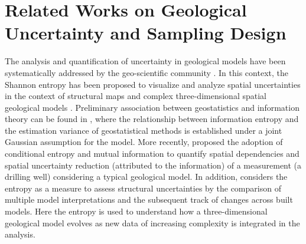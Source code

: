 \section{Related Works on Geological Uncertainty and Sampling Design} %
\label{sec_literature_context_PI}
{The analysis and quantification of uncertainty in geological models have been systematically addressed by the geo-scientific community} \citep{gutjahr1991,goovaerts2001,Scheidt2009_a,wellman_2012a}. { In this context, the Shannon entropy has been proposed to visualize and analyze spatial uncertainties in the context of structural maps and complex three-dimensional spatial geological models \citep{goodchild_1994,wellman_2012a,wellman_2010a}. Preliminary association between geostatistics and information theory can be found in \citep{peschel_1991a}, where the relationship between information entropy and the estimation variance of geostatistical methods is established under a joint Gaussian assumption for the model.
More recently, \citep{wellman_2013} proposed the adoption of conditional entropy and mutual information to quantify spatial dependencies and spatial uncertainty reduction (attributed to the information) of a measurement (a drilling well) considering  a typical geological model.
In addition, \citep{schweizer_2017a} considers the %
entropy  as a %
measure to assess structural uncertainties by the comparison of multiple model interpretations and the subsequent track of changes across built models. Here the entropy is used to understand how a three-dimensional geological model evolves as new data of increasing complexity is integrated in the analysis.}
 
